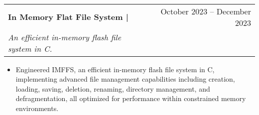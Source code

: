 ~\documentclass[letterpaper,11pt]{article}
\makeatletter
\newcommand{\resumeItem}[1]{
  \item\small{
    {#1 \vspace{-2pt}}
  }
}
\newcommand{\resumeSubheading}[4]{
  \vspace{-2pt}\item
    \begin{tabular*}{0.97\textwidth}[t]{l@{\extracolsep{\fill}}r}
      \textbf{#1} & #2 \\
      \textit{\small#3} & \textit{\small #4} \\
    \end{tabular*}\vspace{-4pt} %
}
\newcommand{\resumeSubHeadingListEnd}{\end{itemize}}
\newcommand{\resumeItemListStart}{\begin{itemize}}
\makeatother
\begin{document}
      \vspace{-4pt} %

      \resumeSubheading
      {In Memory Flat File System | }{October 2023 -- December 2023}
      {An efficient in-memory flash file system in C.}{}
      \resumeItemListStart
        \resumeItem{Engineered IMFFS, an efficient in-memory flash file system in C, implementing advanced file management capabilities including creation, loading, saving, deletion, renaming, directory management, and defragmentation, all optimized for performance within constrained memory environments.}





      
\resumeSubHeadingListEnd
\end{document}
